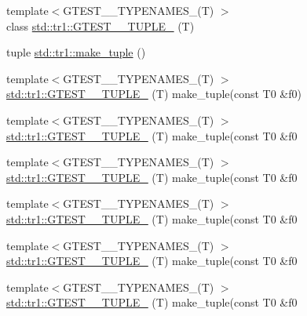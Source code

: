 \begin{DoxyCompactItemize}
\item 
{\footnotesize template$<$G\+T\+E\+S\+T\+\_\+\_\+\+T\+Y\+P\+E\+N\+A\+M\+E\+S\+\_\+(\+T) $>$ }\\class \hyperlink{namespacestd_1_1tr1_ab4f2c7d5458171bec6c4330fc5c7aba6}{std\+::tr1\+::\+G\+T\+E\+S\+T\+\_\+\_\+\+T\+U\+P\+L\+E\+\_\+} (T)
\item 
tuple \hyperlink{namespacestd_1_1tr1_af7e12a0f5b5791b5b7c49a5a17b85359}{std\+::tr1\+::make\+\_\+tuple} ()
\item 
{\footnotesize template$<$G\+T\+E\+S\+T\+\_\+\_\+\+T\+Y\+P\+E\+N\+A\+M\+E\+S\+\_\+(\+T) $>$ }\\\hyperlink{namespacestd_1_1tr1_a8b196fb65b7521a688f59c51418ab191}{std\+::tr1\+::\+G\+T\+E\+S\+T\+\_\+\_\+\+T\+U\+P\+L\+E\+\_\+} (T) make\+\_\+tuple(const T0 \&f0)
\item 
{\footnotesize template$<$G\+T\+E\+S\+T\+\_\+\_\+\+T\+Y\+P\+E\+N\+A\+M\+E\+S\+\_\+(\+T) $>$ }\\\hyperlink{namespacestd_1_1tr1_a90d9f0e7f95fa1c2093372d72493c3c1}{std\+::tr1\+::\+G\+T\+E\+S\+T\+\_\+\_\+\+T\+U\+P\+L\+E\+\_\+} (T) make\+\_\+tuple(const T0 \&f0
\item 
{\footnotesize template$<$G\+T\+E\+S\+T\+\_\+\_\+\+T\+Y\+P\+E\+N\+A\+M\+E\+S\+\_\+(\+T) $>$ }\\\hyperlink{namespacestd_1_1tr1_a4493d91e61718415264f7e72fea42930}{std\+::tr1\+::\+G\+T\+E\+S\+T\+\_\+\_\+\+T\+U\+P\+L\+E\+\_\+} (T) make\+\_\+tuple(const T0 \&f0
\item 
{\footnotesize template$<$G\+T\+E\+S\+T\+\_\+\_\+\+T\+Y\+P\+E\+N\+A\+M\+E\+S\+\_\+(\+T) $>$ }\\\hyperlink{namespacestd_1_1tr1_a4e57e6fab4219802275bd31821b31b58}{std\+::tr1\+::\+G\+T\+E\+S\+T\+\_\+\_\+\+T\+U\+P\+L\+E\+\_\+} (T) make\+\_\+tuple(const T0 \&f0
\item 
{\footnotesize template$<$G\+T\+E\+S\+T\+\_\+\_\+\+T\+Y\+P\+E\+N\+A\+M\+E\+S\+\_\+(\+T) $>$ }\\\hyperlink{namespacestd_1_1tr1_a6f8af2da768a7ea1e48b2700d1288166}{std\+::tr1\+::\+G\+T\+E\+S\+T\+\_\+\_\+\+T\+U\+P\+L\+E\+\_\+} (T) make\+\_\+tuple(const T0 \&f0
\item 
{\footnotesize template$<$G\+T\+E\+S\+T\+\_\+\_\+\+T\+Y\+P\+E\+N\+A\+M\+E\+S\+\_\+(\+T) $>$ }\\\hyperlink{namespacestd_1_1tr1_a31cde155977a4544af2b44b51ffe69ac}{std\+::tr1\+::\+G\+T\+E\+S\+T\+\_\+\_\+\+T\+U\+P\+L\+E\+\_\+} (T) make\+\_\+tuple(const T0 \&f0
\item 

\end{DoxyCompactItemize}
